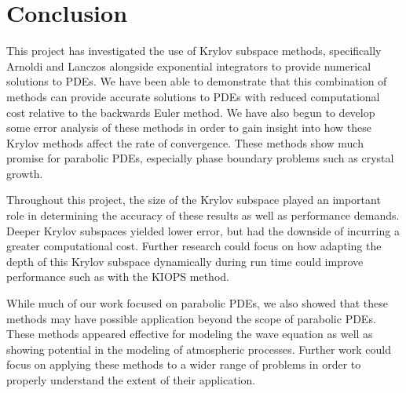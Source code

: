 \section{Conclusion}

This project has investigated the use of Krylov subspace methods, specifically Arnoldi and Lanczos alongside exponential integrators to provide numerical solutions to PDEs.
We have been able to demonstrate that this combination of methods can provide accurate solutions to PDEs with reduced computational cost relative to the backwards Euler method.
We have also begun to develop some error analysis of these methods in order to gain insight into how these Krylov methods affect the rate of convergence.
These methods show much promise for parabolic PDEs, especially phase boundary problems such as crystal growth.

Throughout this project, the size of the Krylov subspace played an important role in determining the accuracy of these results as well as performance demands.
Deeper Krylov subspaces yielded lower error, but had the downside of incurring a greater computational cost.
Further research could focus on how adapting the depth of this Krylov subspace dynamically during run time could improve performance such as with the KIOPS\cite{Gaudreault2018} method.

While much of our work focused on parabolic PDEs, we also showed that these methods may have possible application beyond the scope of parabolic PDEs.
These methods appeared effective for modeling the wave equation as well as showing potential in the modeling of atmospheric processes.
Further work could focus on applying these methods to a wider range of problems in order to properly understand the extent of their application.
